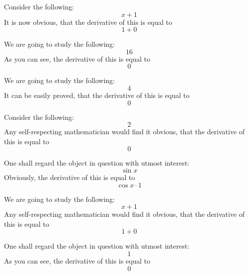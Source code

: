 \documentclass{article}
\begin{document}
Consider the following:
\begin{equation}
x + 1 
\end{equation}
It is now obvious, that the derivative of this is equal to
\begin{equation}
1 + 0 
\end{equation}

We are going to study the following:
\begin{equation}
16 
\end{equation}
As you can see, the derivative of this is equal to
\begin{equation}
0 
\end{equation}

We are going to study the following:
\begin{equation}
4 
\end{equation}
It can be easily proved, that the derivative of this is equal to
\begin{equation}
0 
\end{equation}

Consider the following:
\begin{equation}
2 
\end{equation}
Any self-respecting mathematician would find it obvious, that the derivative of this is equal to
\begin{equation}
0 
\end{equation}

One shall regard the object in question with utmost interest:
\begin{equation}
\sin x 
\end{equation}
Obviously, the derivative of this is equal to
\begin{equation}
\cos x \cdot 1 
\end{equation}

We are going to study the following:
\begin{equation}
x + 1 
\end{equation}
Any self-respecting mathematician would find it obvious, that the derivative of this is equal to
\begin{equation}
1 + 0 
\end{equation}

One shall regard the object in question with utmost interest:
\begin{equation}
1 
\end{equation}
As you can see, the derivative of this is equal to
\begin{equation}
0 
\end{equation}
\end{document}
